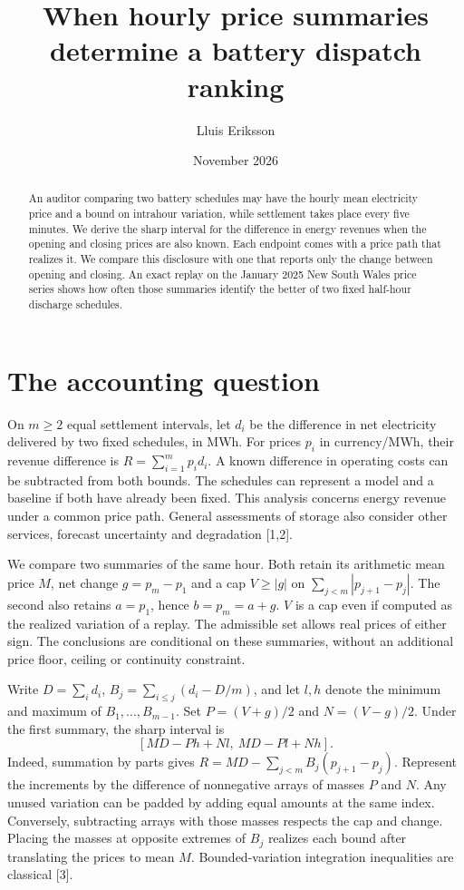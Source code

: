 \documentclass[11pt]{article}
\title{When hourly price summaries determine a battery dispatch ranking}
\author{Lluis Eriksson}
\date{November 2026}
\begin{document}
\maketitle
\begin{abstract}
An auditor comparing two battery schedules may have the hourly mean electricity price and a bound on intrahour variation, while settlement takes place every five minutes. We derive the sharp interval for the difference in energy revenues when the opening and closing prices are also known. Each endpoint comes with a price path that realizes it. We compare this disclosure with one that reports only the change between opening and closing. An exact replay on the January 2025 New South Wales price series shows how often those summaries identify the better of two fixed half-hour discharge schedules.
\end{abstract}

\section{The accounting question}
On $m\ge2$ equal settlement intervals, let $d_i$ be the difference in net electricity delivered by two fixed schedules, in MWh. For prices $p_i$ in currency/MWh, their revenue difference is $R=\sum_{i=1}^m p_i d_i$. A known difference in operating costs can be subtracted from both bounds. The schedules can represent a model and a baseline if both have already been fixed. This analysis concerns energy revenue under a common price path. General assessments of storage also consider other services, forecast uncertainty and degradation [1,2].

We compare two summaries of the same hour. Both retain its arithmetic mean price $M$, net change $g=p_m-p_1$ and a cap $V\ge |g|$ on $\sum_{j<m}|p_{j+1}-p_j|$. The second also retains $a=p_1$, hence $b=p_m=a+g$. $V$ is a cap even if computed as the realized variation of a replay. The admissible set allows real prices of either sign. The conclusions are conditional on these summaries, without an additional price floor, ceiling or continuity constraint.

Write $D=\sum_i d_i$, $B_j=\sum_{i\le j}(d_i-D/m)$, and let $l,h$ denote the minimum and maximum of $B_1,\ldots,B_{m-1}$. Set $P=(V+g)/2$ and $N=(V-g)/2$. Under the first summary, the sharp interval is
\[
[MD-Ph+Nl,\ MD-Pl+Nh].
\]
Indeed, summation by parts gives $R=MD-\sum_{j<m} B_j(p_{j+1}-p_j)$. Represent the increments by the difference of nonnegative arrays of masses $P$ and $N$. Any unused variation can be padded by adding equal amounts at the same index. Conversely, subtracting arrays with those masses respects the cap and change. Placing the masses at opposite extremes of $B_j$ realizes each bound after translating the prices to mean $M$. Bounded-variation integration inequalities are classical [3].
\end{document}
